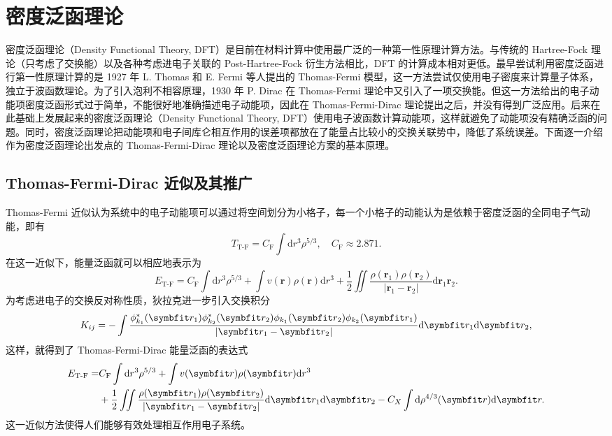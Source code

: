 \chapter{密度泛函理论}
密度泛函理论（Density Functional Theory, DFT）是目前在材料计算中使用最广泛的一种第一性原理计算方法。与传统的 Hartree-Fock 理论（只考虑了交换能）以及各种考虑进电子关联的 Post-Hartree-Fock 衍生方法相比，DFT 的计算成本相对更低。最早尝试利用密度泛函进行第一性原理计算的是 1927 年 L. Thomas 和 E. Fermi 等人提出的 Thomas-Fermi 模型，这一方法尝试仅使用电子密度来计算量子体系，独立于波函数理论\cite{Fermi1927, Thomas_1927}。为了引入泡利不相容原理，1930 年 P. Dirac 在 Thomas-Fermi 理论中又引入了一项交换能\cite{dirac_1930}。但这一方法给出的电子动能项密度泛函形式过于简单，不能很好地准确描述电子动能项，因此在 Thomas-Fermi-Dirac 理论提出之后，并没有得到广泛应用。后来在此基础上发展起来的密度泛函理论（Density Functional Theory, DFT）使用电子波函数计算动能项，这样就避免了动能项没有精确泛函的问题。同时，密度泛函理论把动能项和电子间库仑相互作用的误差项都放在了能量占比较小的交换关联势中，降低了系统误差。下面逐一介绍作为密度泛函理论出发点的 Thomas-Fermi-Dirac 理论以及密度泛函理论方案的基本原理。
\section{Thomas-Fermi-Dirac 近似及其推广}
Thomas-Fermi 近似认为系统中的电子动能项可以通过将空间划分为小格子，每一个小格子的动能认为是依赖于密度泛函的全同电子气动能，即有
\begin{equation}
    T_{\text{T-F}}=C_{\text{F}}\int\text{d}r^3 \rho^{5/3},\quad C_{\text{F}}\approx 2.871.
\end{equation}
在这一近似下，能量泛函就可以相应地表示为 
\begin{equation}
    E_{\text{T-F}}=C_{\text{F}}\int\text{d}r^3 \rho^{5/3}+\int v(\boldsymbol{r})\rho(\boldsymbol{r})\text{d}r^3+\frac{1}{2}\iint\frac{\rho(\boldsymbol{r}_1)\rho(\boldsymbol{r}_2)}{\left| \boldsymbol{r}_1-\boldsymbol{r}_2 \right|}\text{d}\boldsymbol{r}_1\boldsymbol{r}_2.
\end{equation}
为考虑进电子的交换反对称性质，狄拉克进一步引入交换积分 
\begin{equation}
    K_{ij}=-\int\frac{\phi^*_{k_1}(\vct{r}_1)\phi^*_{k_2}(\vct{r}_2)\phi_{k_1}(\vct{r}_2)\phi_{k_2}(\vct{r}_1)}{\left| \vct{r}_1-\vct{r}_2 \right|}\dd\vct{r}_1\dd\vct{r}_2,
\end{equation}
这样，就得到了 Thomas-Fermi-Dirac 能量泛函的表达式 
\begin{equation}
    \begin{aligned}
        E_{\text{T-F}}=&C_{\text{F}}\int\text{d}r^3 \rho^{5/3}+\int v(\boldsymbol{r})\rho(\boldsymbol{r})\text{d}r^3\\
        &+\frac{1}{2}\iint\frac{\rho(\boldsymbol{r}_1)\rho(\boldsymbol{r}_2)}{\left| \boldsymbol{r}_1-\boldsymbol{r}_2 \right|}\text{d}\boldsymbol{r}_1\dd\boldsymbol{r}_2-C_X\int\dd\rho^{4/3}(\vct{r})\dd\vct{r}.
    \end{aligned}
\end{equation}
这一近似方法使得人们能够有效处理相互作用电子系统。

